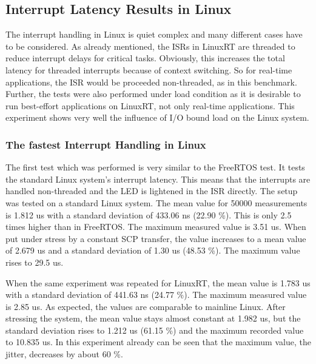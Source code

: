 \subsection{Interrupt Latency Results in Linux}\label{ss_interrupt_latency_results_in_linux}
The interrupt handling in Linux is quiet complex and many different cases have to be considered. 
As already mentioned, the \acp{ISR} in LinuxRT are threaded to reduce interrupt delays for critical tasks. 
Obviously, this increases the total latency for threaded interrupts because of context switching.
So for real-time applications, the \ac{ISR} would be proceeded non-threaded, as in this benchmark.
Further, the tests were also performed under load condition as it is desirable to run best-effort applications on LinuxRT, not only real-time applications. 
This experiment shows very well the influence of \ac{I/O} bound load on the Linux system.

\subsubsection{The fastest Interrupt Handling in Linux}
The first test which was performed is very similar to the FreeRTOS test. 
It tests the standard Linux system's interrupt latency.
This means that the interrupts are handled non-threaded and the \ac{LED} is lightened in the \ac{ISR} directly.
The setup was tested on a standard Linux system.
The mean value for 50000 measurements is 1.812 us with a standard deviation of 433.06 ns (22.90 \%). 
This is only 2.5 times higher than in FreeRTOS. 
The maximum measured value is 3.51 us.
When put under stress by a constant SCP transfer, the value increases to a mean value of 2.679 us and a standard deviation of 1.30 us (48.53 \%).
The maximum value rises to 29.5 us.
\par
When the same experiment was repeated for LinuxRT, the mean value is 1.783 us with a standard deviation of 441.63 ns (24.77 \%). 
The maximum measured value is 2.85 us.
As expected, the values are comparable to mainline Linux.
After stressing the system, the mean value stays almost constant at 1.982 us, but the standard deviation rises to 1.212 us (61.15 \%) and the maximum recorded value to 10.835 us.
In this experiment already can be seen that the maximum value, the jitter, decreases by about 60 \%.

